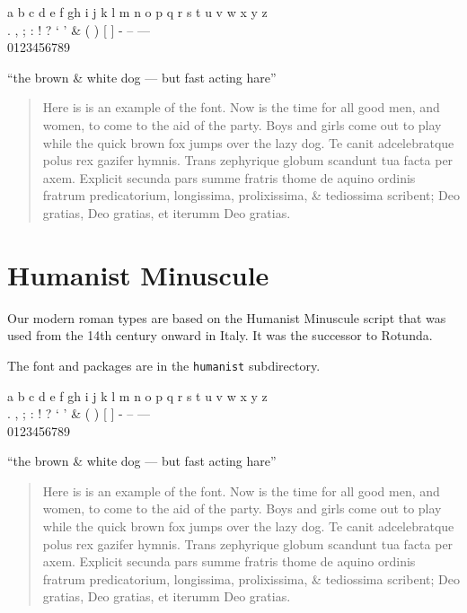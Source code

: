 \documentclass{article}
\newcommand{\abc}{a b c d e f gh i j k l m n o p q r s t u v w x y z}
\newcommand{\punct}{. , ; : ! ? ` ' \& ( ) [ ]}
\newcommand{\figs}{0123456789}
\newcommand{\dashes}{- -- ---}
\newcommand{\ligs}{``the brown \& white dog --- but fast acting hare''}
\newcommand{\sentence}{%
    now is the time for all good
men, and women, to come to the aid of the party while the quick brown fox
jumps over the lazy dog.}
\newcommand{\latin}{%
    Te canit adcelebratque polus rex gazifer hymnis.
Trans zephyrique globum scandunt tua facta per axem.
Explicit secunda pars summe fratris thome de aquino
ordinis fratrum predicatorium, longissima, prolixissima,
\& tediossima scribent; Deo gratias, Deo gratias, et iterumm
Deo gratias.
}
\renewcommand{\sentence}{%
Here is is an example of the font. Now is the time for all good
men, and women, to come to the aid of the party. Boys and girls come
out to play while the quick brown fox jumps over the lazy dog.}
\begin{document}
\begin{center}
\rtndfamily
\abc \\
\punct{} \dashes \\
\figs 

\ligs\par
\end{center}

\begin{quotation}
\renewcommand{\baselinestretch}{1.1}
\rtndfamily
\sentence{} \latin \par
\end{quotation}


\clearpage
\section{Humanist Minuscule}

    Our modern roman types are based on the Humanist Minuscule script that
was used from the 14th century onward in Italy. It was the successor to Rotunda.


    The font and packages are in the \texttt{humanist} subdirectory.

\begin{center}
\hminfamily
\abc \\
\punct{} \dashes \\
\figs 

\ligs\par
\end{center}

\begin{quotation}
\renewcommand{\baselinestretch}{1.0}
\hminfamily
\sentence{} \latin \par
\end{quotation}
\end{document}
